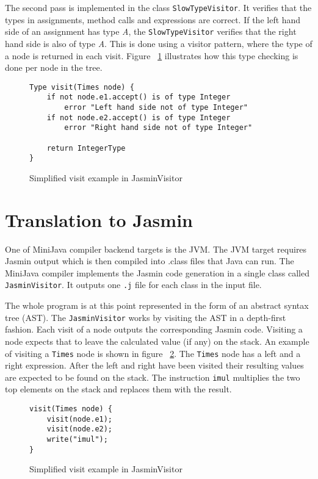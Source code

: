\documentclass[11pt]{amsart}
\begin{document}
	The second pass is implemented in the class \texttt{SlowTypeVisitor}. It verifies that the types in assignments, method calls and expressions are correct. If the left hand side of an assignment has type \textit{A}, the \texttt{SlowTypeVisitor} verifies that the right hand side is also of type \textit{A}. This is done using a visitor pattern, where the type of a node is returned in each visit. Figure ~\ref{fig:timestypecheck} illustrates how this type checking is done per node in the tree.

	\begin{figure}[H]
		\label{fig:timestypecheck}
		\begin{lstlisting}
Type visit(Times node) {
	if not node.e1.accept() is of type Integer
		error "Left hand side not of type Integer"
	if not node.e2.accept() is of type Integer
		error "Right hand side not of type Integer"

	return IntegerType
}
		\end{lstlisting}
		\caption{Simplified visit example in JasminVisitor}
	\end{figure}

\section{Translation to Jasmin}
	One of MiniJava compiler backend targets is the JVM. The JVM target requires Jasmin\cite{jasmin} output which is then compiled into .class files that Java can run. The MiniJava compiler implements the Jasmin code generation in a single class called \texttt{JasminVisitor}. It outputs one \texttt{.j} file for each class in the input file.

	The whole program is at this point represented in the form of an abstract syntax tree (AST). The \texttt{JasminVisitor} works by visiting the AST in a depth-first fashion. Each visit of a node outputs the corresponding Jasmin code. Visiting a node expects that to leave the calculated value (if any) on the stack. An example of visiting a \texttt{Times} node is shown in figure ~\ref{fig:timesexample}. The \texttt{Times} node has a left and a right expression. After the left and right have been visited their resulting values are expected to be found on the stack. The instruction \texttt{imul} multiplies the two top elements on the stack and replaces them with the result.

	\begin{figure}[H]
		\label{fig:timesexample}
		\begin{lstlisting}
visit(Times node) {
	visit(node.e1);
	visit(node.e2);
	write("imul");
}
		\end{lstlisting}
		\caption{Simplified visit example in JasminVisitor}
	\end{figure}
\end{document}
